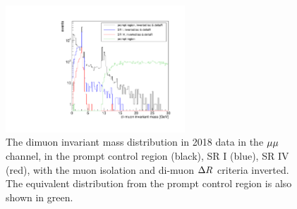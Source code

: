 \begin{figure}
\centering
\includegraphics[width=0.6\textwidth]{figures/bg/mumuInvMass_comparison.pdf}
\caption{The dimuon invariant mass distribution in 2018 data in the ${\mu}{\mu}$ channel, in the prompt control region (black), SR I (blue), SR IV (red), with the muon isolation and di-muon $\Delta R$ criteria inverted. The equivalent distribution from the prompt control region is also shown in green.}
\label{mumu_inv_mass_inverted_iso_lo}
\end{figure}